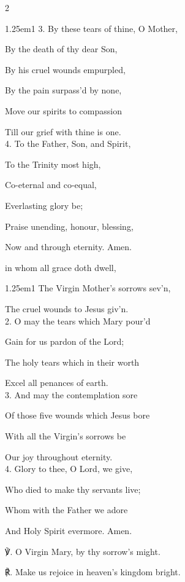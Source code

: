 \begin{paracol}{2}
\begin{hangparas}{1.25em}{1}
3. By these tears of thine, O Mother,

By the death of thy dear Son,

By his cruel wounds empurpled,

By the pain surpass'd by none,

Move our spirits to compassion

Till our grief with thine is one.\\

4. To the Father, Son, and Spirit,

To the Trinity most high,

Co-eternal and co-equal,

Everlasting glory be;

Praise unending, honour, blessing,

Now and through eternity. Amen.
\end{hangparas}

\mattinsOfficeHymn
{} in whom all grace doth dwell,


\begin{hangparas}{1.25em}{1}
The Virgin Mother’s sorrows sev'n,

The cruel wounds to Jesus giv'n.\\

2. O may the tears which Mary pour'd

Gain for us pardon of the Lord;

The holy tears which in their worth

Excel all penances of earth.\\

3. And may the contemplation sore

Of those five wounds which Jesus bore

With all the Virgin’s sorrows be

Our joy throughout eternity.\\

4. Glory to thee, O Lord, we give,

Who died to make thy servants live;

Whom with the Father we adore

And Holy Spirit evermore. Amen.\\
\end{hangparas}

℣. O Virgin Mary, by thy sorrow’s might.

℟. Make us rejoice in heaven’s kingdom bright.


\fussy	
\end{paracol}

